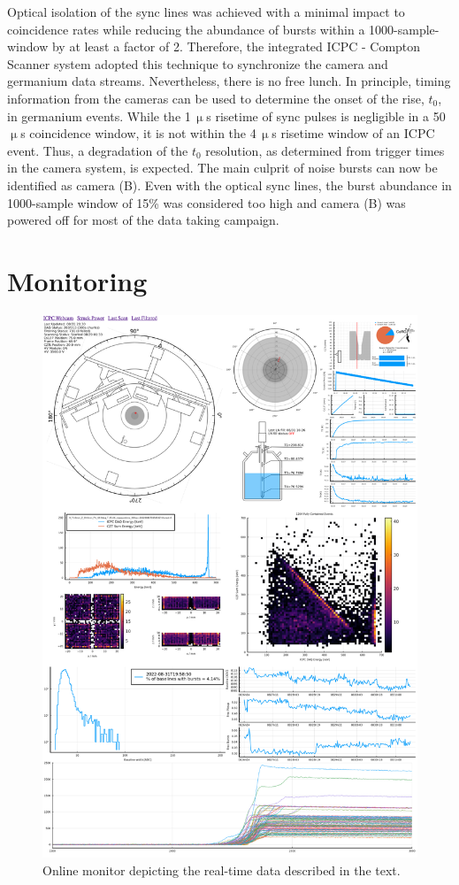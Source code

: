 Optical isolation of the sync lines was achieved with a minimal impact to coincidence rates while reducing the abundance of bursts within a 1000-sample-window by at least a factor of 2. Therefore, the integrated ICPC - Compton Scanner system adopted this technique to synchronize the camera and germanium data streams. Nevertheless, there is no free lunch. In principle, timing information from the cameras can be used to determine the onset of the rise, $t_0$, in germanium events. While the 1\,$\upmu$s risetime of sync pulses is negligible in a 50\,$\upmu$s coincidence window, it is not within the 4\,$\upmu$s risetime window of an ICPC event. Thus, a degradation of the $t_0$ resolution, as determined from trigger times in the camera system, is expected. The main culprit of noise bursts can now be identified as camera (B). Even with the optical sync lines, the burst abundance in 1000-sample window of 15\% was considered too high and camera (B) was powered off for most of the data taking campaign. 

\section{Monitoring} \label{sec:monitoring}
\begin{figure}[H]
    \centering
    \includegraphics[width=5.4in]{figs/integration/icpc_monitor.png}
    \caption{Online monitor depicting the real-time data described in the text.}
    \label{fig:remote_monitoring}
\end{figure}

